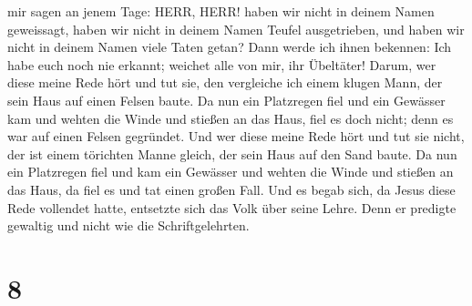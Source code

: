 mir sagen an jenem Tage: HERR, HERR! haben wir nicht in deinem Namen
geweissagt, haben wir nicht in deinem Namen Teufel ausgetrieben, und
haben wir nicht in deinem Namen viele Taten getan?  Dann
werde ich ihnen bekennen: Ich habe euch noch nie erkannt; weichet alle
von mir, ihr Übeltäter!  Darum, wer diese meine Rede hört
und tut sie, den vergleiche ich einem klugen Mann, der sein Haus auf
einen Felsen baute.  Da nun ein Platzregen fiel und ein
Gewässer kam und wehten die Winde und stießen an das Haus, fiel es doch
nicht; denn es war auf einen Felsen gegründet.  Und wer
diese meine Rede hört und tut sie nicht, der ist einem törichten Manne
gleich, der sein Haus auf den Sand baute.  Da nun ein
Platzregen fiel und kam ein Gewässer und wehten die Winde und stießen an
das Haus, da fiel es und tat einen großen Fall.  Und es
begab sich, da Jesus diese Rede vollendet hatte, entsetzte sich das Volk
über seine Lehre.  Denn er predigte gewaltig und nicht wie
die Schriftgelehrten.

\hypertarget{section-7}{%
\section{8}\label{section-7}}

